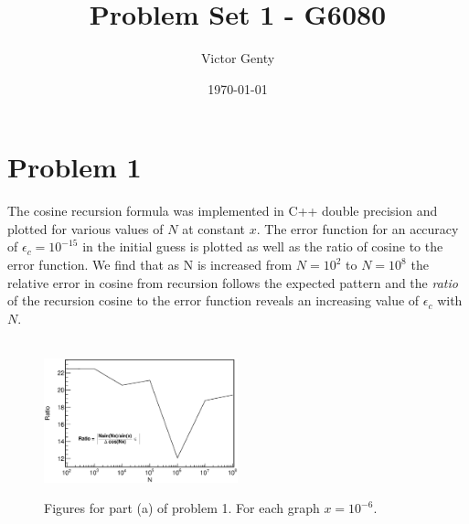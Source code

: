\documentclass[preprint,notitlepage,nofootinbib]{revtex4-1}
\begin{document}
\title{Problem Set 1 - G6080}
\author{Victor Genty}
\date{\today}
\maketitle
\section{Problem 1}
The cosine recursion formula  was implemented in C++ double precision and plotted for various values of $N$ at constant $x$. The error function for an accuracy of $\epsilon_c = 10^{-15}$ in the initial guess is plotted as well as the ratio of cosine to the error function. We find that as N is increased from $N=10^{2}$ to $N=10^8$ the relative error in cosine from recursion follows the expected pattern and the {\it ratio} of the recursion cosine to the error function reveals an increasing value of $\epsilon_c$ with $N$.
\begin{figure}[h]
  \centering
{}
\\
  \includegraphics[width=0.5\textwidth]{figures/1a_ratio.eps}
  \hfill
  \caption{Figures for part (a) of problem 1. For each graph $x = 10^{-6}$.}
\end{figure}\\
\end{document}
